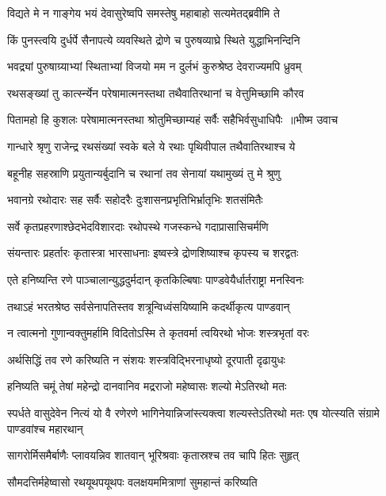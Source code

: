 \twolineshloka
{विद्यते मे न गाङ्गेय भयं देवासुरेष्वपि}
{समस्तेषु महाबाहो सत्यमेतद्ब्रवीमि ते}


\twolineshloka
{किं पुनस्त्वयि दुर्धर्पे सैनापत्ये व्यवस्थिते}
{द्रोणे च पुरुषव्याघ्रे स्थिते युद्धाभिनन्दिनि}


\twolineshloka
{भवद्र्यां पुरुषाग्र्याभ्यां स्थिताभ्यां विजयो मम}
{न दुर्लभं कुरुश्रेष्ठ देवराज्यमपि ध्रुवम्}


\twolineshloka
{रथसङ्ख्यां तु कार्त्स्न्येन परेषामात्मनस्तथा}
{तथैवातिरथानां च वेत्तुमिच्छामि कौरव}


\threelineshloka
{पितामहो हि कुशलः परेषामात्मनस्तथा}
{श्रोतुमिच्छाम्यहं सर्वैः सहैभिर्वसुधाधिपैः ॥भीष्म उवाच}
{}


\twolineshloka
{गान्धारे श्रृणु राजेन्द्र रथसंख्यां स्वके बले}
{ये रथाः पृथिवीपाल तथैवातिरथाश्च ये}


\twolineshloka
{बहूनीह सहस्राणि प्रयुतान्यर्बुदानि च}
{रथानां तव सेनायां यथामुख्यं तु मे श्रुणु}


\twolineshloka
{भवानग्रे रथोदारः सह सर्वैः सहोदरैः}
{दुःशासनप्रभृतिभिर्भ्रातृभिः शतसंमितैः}


\twolineshloka
{सर्वे कृतप्रहरणाश्छेदभेदविशारदाः}
{रथोपस्थे गजस्कन्धे गदाप्रासासिचर्मणि}


\twolineshloka
{संयन्तारः प्रहर्तारः कृतास्त्रा भारसाधनाः}
{इष्वस्त्रे द्रोणशिष्याश्च कृपस्य च शरद्वतः}


\twolineshloka
{एते हनिष्यन्ति रणे पाञ्चालान्युद्धदुर्मदान्}
{कृतकिल्बिषाः पाण्डवेयैर्धार्तराष्ट्रा मनस्विनः}


\twolineshloka
{तथाऽहं भरतश्रेष्ठ सर्वसेनापतिस्तव}
{शत्रून्विध्वंसयिष्यामि कदर्थीकृत्य पाण्डवान्}


\twolineshloka
{न त्वात्मनो गुणान्वक्तुमर्हामि विदितोऽस्मि ते}
{कृतवर्मा त्वयिरथो भोजः शस्त्रभृतां वरः}


\twolineshloka
{अर्थसिद्धिं तव रणे करिष्यति न संशयः}
{शस्त्रविद्भिरनाधृष्यो दूरपाती दृढायुधः}


\twolineshloka
{हनिष्यति चमूं तेषां महेन्द्रो दानवानिव}
{मद्रराजो महेष्वासः शल्यो मेऽतिरथो मतः}


\threelineshloka
{स्पर्धते वासुदेवेन नित्यं यो वै रणेरणे}
{भागिनेयान्निजांस्त्यक्त्वा शल्यस्तेऽतिरथो मतः}
{एष योत्स्यति संग्रामे पाण्डवांश्च महारथान्}


\twolineshloka
{सागरोर्मिसमैर्बाणैः प्लावयन्निव शातवान्}
{भूरिश्रवाः कृतास्रश्च तव चापि हितः सुहृत्}


\twolineshloka
{सौमदत्तिर्महेष्वासो रथयूथपयूथपः}
{वलक्षयममित्राणां सुमहान्तं करिष्यति}


